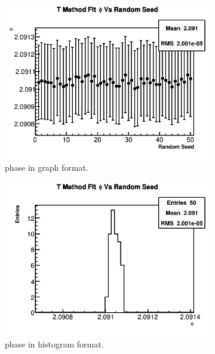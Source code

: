 \begin{figure}[]
	    \begin{subfigure}[t]{0.45\textwidth}
		    \centering
			\includegraphics[width=\textwidth]{TMethod_phi_Vs_Iter_Canv}
		    \caption{\gmtwo phase in graph format.}
	    \end{subfigure}
	    \hspace{4mm}
	    \begin{subfigure}[t]{0.45\textwidth}
		    \centering
			\includegraphics[width=\textwidth]{TMethod_phi_Vs_Iter_Canv_hist}
		    \caption{\gmtwo phase in histogram format.}
	    \end{subfigure}%
	   	\vspace{4mm}
	   	\begin{subfigure}[t]{0.45\textwidth}

\end{subfigure}
\end{figure}

